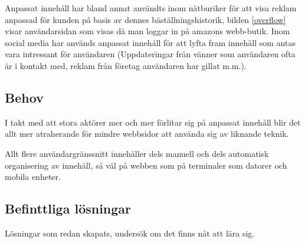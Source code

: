 Anpassat innehåll har bland annat användts inom nätburiker för att visa reklam anpassad för kunden på basis av dennes bäställningshistorik, bilden \ref{overflow} visar användarsidan som visas då man loggar in på amazons webb-butik. Inom social media har används anpassat innehåll för att lyfta fram innehåll som antas vara intressant för användaren (Uppdateringar från vänner som användaren ofta är i kontakt med, reklam från företag användaren har gillat m.m.).


\subsection{Behov}

I takt med att stora aktörer mer och mer förlitar sig på anpassat innehåll blir det allt mer atraherande för mindre webbsidor att använda sig av liknande teknik.

Allt flere användargränssnitt innehåller dels manuell och dels automatisk organisering av innehåll, så väl på webben som på terminaler som datorer och mobila enheter.

\subsection{Befinttliga lösningar}

Lösningar som redan skapats, undersök om det finns nåt att lära sig.



